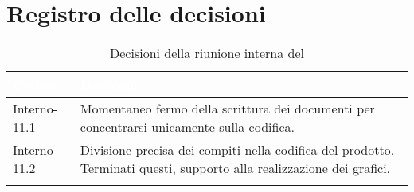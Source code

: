 \section{Registro delle decisioni}
{
\renewcommand{\arraystretch}{1.5}
\centering
\begin{longtable}{C{3cm} C{9cm}}
\textcolor{white}{\textbf{Codice}}&
\textcolor{white}{\textbf{Decisione}}\\	

\endhead
		
Interno-11.1 & Momentaneo fermo della scrittura dei documenti per concentrarsi unicamente sulla codifica.\\
Interno-11.2 & Divisione precisa dei compiti nella codifica del prodotto. Terminati questi, supporto alla realizzazione dei grafici.\\


\caption{Decisioni della riunione interna del \Data{}}
\end{longtable}
}

